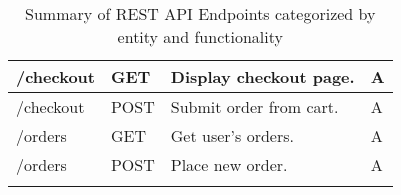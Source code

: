 \begin{longtable}{|p{}|p{} |p{}|p{}|}
    /checkout & GET & Display checkout page. & A \\
    \hline
    /checkout & POST & Submit order from cart. & A \\
    \hline
    /orders & GET & Get user’s orders. & A \\
    \hline
    /orders & POST & Place new order. & A \\
    \hline

    \caption{Summary of REST API Endpoints categorized by entity and functionality}
    \label{tab:apiSummary}
\end{longtable}
